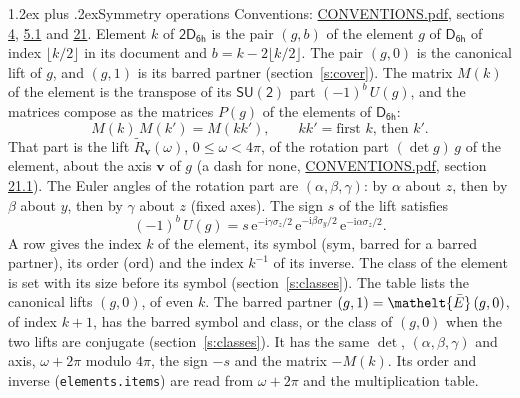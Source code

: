 \documentclass[10pt,a4paper]{article}
\makeatletter
\renewcommand\section{\@startsection{section}{1}{\z@}{-3ex plus -1ex minus -.2ex}%
  {1.2ex plus .2ex}{\normalfont\large\sffamily\bfseries\color{parttitle}}}
\numberwithin{equation}{section}
\newcommand{\eltfont}[1]{{\let\sigma\eltsigma\mathelt{#1}}}
\newcommand{\grp}[1]{\mathsf{#1}}
\newcommand{\elt}[1]{\eltfont{#1}}
\newcommand{\vv}{\mathbf{v}}
\newcommand{\iunit}{\mathrm{i}}
\newcommand{\expe}{\mathrm{e}}
\newcommand{\barred}[1]{\bar{#1}}
\newcommand{\lift}[1]{\tilde{#1}}
\newcommand{\pauli}[1]{\sigma_{#1}}
\makeatother
\begin{document}
\section{Symmetry operations}\label{s:elements}
Conventions: \href{../../CONVENTIONS.pdf}{CONVENTIONS.pdf}, sections \href{../../../rotation/CONVENTIONS.pdf\#conv.4}{4}, \href{../../../rotation/CONVENTIONS.pdf\#conv.5.1}{5.1} and \href{../../CONVENTIONS.pdf\#conv.21}{21}.
\leavevmode\label{n:index.element}\label{n:element.g}Element $k$ of $\grp{2D_{6h}}$ is the pair $(g, b)$ of the element $g$ of \href{../../../rotation/data/pdf/D6h.pdf}{$\grp{D_{6h}}$} of index $\lfloor k/2\rfloor$ in its document and $b = k - 2\lfloor k/2\rfloor$. The pair $(g, 0)$ is the canonical lift of $g$, and $(g, 1)$ is its barred partner (section~\ref{s:cover}). \label{n:matrix.element.pin}\label{n:matrix.element}The matrix $M(k)$ of the element is the transpose of its $\grp{SU(2)}$ part $(-1)^{b}\,U(g)$, and the matrices compose as the matrices $P(g)$ of the elements of $\grp{D_{6h}}$:
\begin{equation}\label{e:mprod}M(k)\,M(k') = M(kk'),\qquad kk' = \text{first } k\text{, then } k'.\end{equation}
\leavevmode\label{n:angle.omega}\label{n:vector.axis}\label{n:vector.pole}That part is the lift $\lift{R}_{\vv}(\omega)$, $0 \le \omega < 4\pi$, of the rotation part $(\det g)\,g$ of the element, about the axis $\vv$ of $g$ (a dash for none, \href{../../CONVENTIONS.pdf}{CONVENTIONS.pdf}, section \href{../../CONVENTIONS.pdf\#conv.21.1}{21.1}). \label{n:angle.euler.alpha}\label{n:angle.euler.beta}\label{n:angle.euler.gamma}\label{n:vector.coordinates}The Euler angles of the rotation part are $(\alpha,\beta,\gamma)$: by $\alpha$ about $z$, then by $\beta$ about $y$, then by $\gamma$ about $z$ (fixed axes). \label{n:local.euler.sign}The sign $s$ of the lift satisfies
\begin{equation}\label{e:euler}(-1)^{b}\,U(g) = s\,\expe^{-\iunit\gamma\pauli{z}/2}\,\expe^{-\iunit\beta\pauli{y}/2}\,\expe^{-\iunit\alpha\pauli{z}/2}.\end{equation}
\leavevmode\label{n:index.element.inverse}\label{n:head.sym}\label{n:head.ord}A row gives the index $k$ of the element, its symbol (sym, barred for a barred partner), its order (ord) and the index $k^{-1}$ of its inverse. \label{n:head.class}The class of the element is set with its size before its symbol (section~\ref{s:classes}).
The table lists the canonical lifts $(g, 0)$, of even $k$. The barred partner $(g, 1) = \elt{\barred{E}}\,(g, 0)$, of index $k + 1$, has the barred symbol and class, or the class of $(g, 0)$ when the two lifts are conjugate (section~\ref{s:classes}). It has the same $\det$, $(\alpha,\beta,\gamma)$ and axis, $\omega + 2\pi$ modulo $4\pi$, the sign $-s$ and the matrix $-M(k)$. Its order and inverse (\texttt{elements.items}) are read from $\omega + 2\pi$ and the multiplication table.
\end{document}
